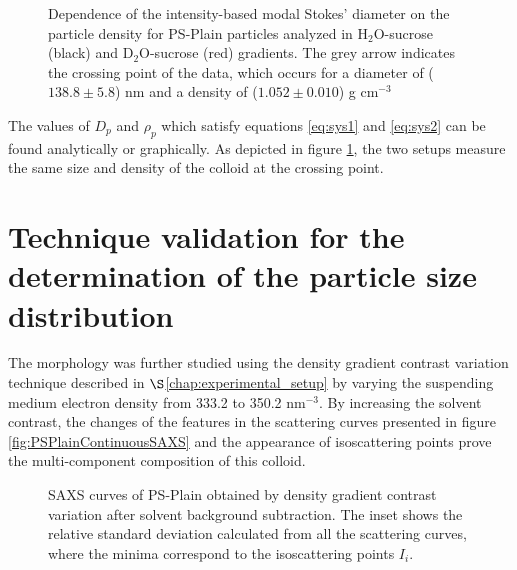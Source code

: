 \begin{figure}
	\begin{center}
		
	\end{center}
	\caption{Dependence of the intensity-based modal Stokes' diameter on the particle density for PS-Plain particles analyzed in H$_2$O-sucrose (black) and D$_2$O-sucrose (red) gradients. The grey arrow indicates the crossing point of the data, which occurs for a diameter of ($138.8\pm5.8$) nm and a density of ($1.052\pm0.010$) g cm$^{-3}$}
	\label{fig:DCSCombinedStokes}
\end{figure}

The values of $D_p$ and $\rho_p$ which satisfy equations \ref{eq:sys1} and \ref{eq:sys2} can be found analytically or graphically. As depicted in figure \ref{fig:DCSCombinedStokes}, the two setups measure the same size and density of the colloid at the crossing point.

\section{Technique validation for the determination of the particle size distribution}
\label{sec:size_validation}
The morphology was further studied using the density gradient contrast variation technique described in $\S$\ref{chap:experimental_setup} by varying the suspending medium electron density from 333.2 to 350.2 nm$^{-3}$. By increasing the solvent contrast, the changes of the features in the scattering curves presented in figure \ref{fig:PSPlainContinuousSAXS} and the appearance of isoscattering points prove the multi-component composition of this colloid.

\begin{figure}%
	\centering

	\caption{SAXS curves of PS-Plain obtained by density gradient contrast variation after solvent background subtraction. The inset shows the relative standard
deviation calculated from all the scattering curves, where the minima correspond to the isoscattering points $I_i$.}
\end{figure}



